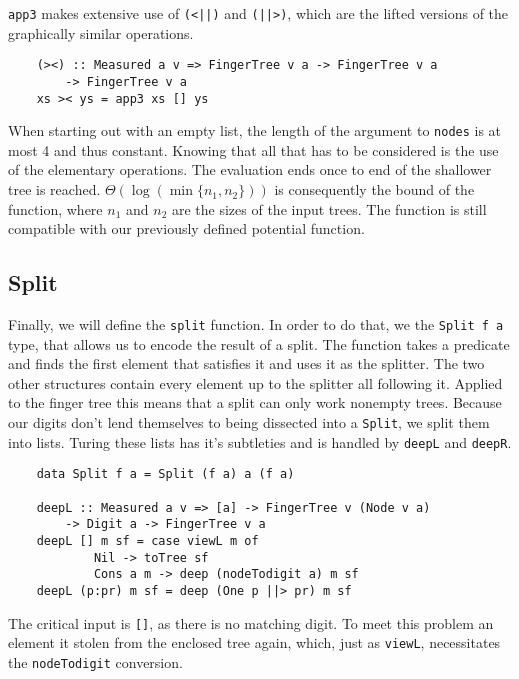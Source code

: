 \texttt{app3} makes extensive use of \texttt{(<||)} and \texttt{(||>)}, which are the lifted versions of the graphically similar operations.

\begin{verbatim}
    (><) :: Measured a v => FingerTree v a -> FingerTree v a
        -> FingerTree v a
    xs >< ys = app3 xs [] ys
\end{verbatim}

When starting out with an empty list, the length of the argument to \texttt{nodes} is at most 4 and thus constant. Knowing that all that has to be considered is the use of the elementary operations. The evaluation ends once to end of the shallower tree is reached. \(\Theta(\log(\min\{n_1,n_2\}))\) is consequently the bound of the function, where \(n_1\) and \(n_2\) are the sizes of the input trees. The function is still compatible with our previously defined potential function.\par

\subsection{Split}

Finally, we will define the \texttt{split} function. In order to do that, we the \texttt{Split f a} type, that allows us to encode the result of a split. The function takes a predicate and finds the first element that satisfies it and uses it as the splitter. The two other structures contain every element up to the splitter all following it. Applied to the finger tree this means that a split can only work nonempty trees. Because our digits don't lend themselves to being dissected into a \texttt{Split}, we split them into lists. Turing these lists has it's subtleties and is handled by \texttt{deepL} and \texttt{deepR}.

\begin{verbatim}
    data Split f a = Split (f a) a (f a)

    deepL :: Measured a v => [a] -> FingerTree v (Node v a)
        -> Digit a -> FingerTree v a
    deepL [] m sf = case viewL m of
            Nil -> toTree sf
            Cons a m -> deep (nodeTodigit a) m sf
    deepL (p:pr) m sf = deep (One p ||> pr) m sf
\end{verbatim}

The critical input is \texttt{[]}, as there is no matching digit. To meet this problem
    an element it stolen from the enclosed tree again, which, just as \texttt{viewL}, necessitates the \texttt{nodeTodigit} conversion.

